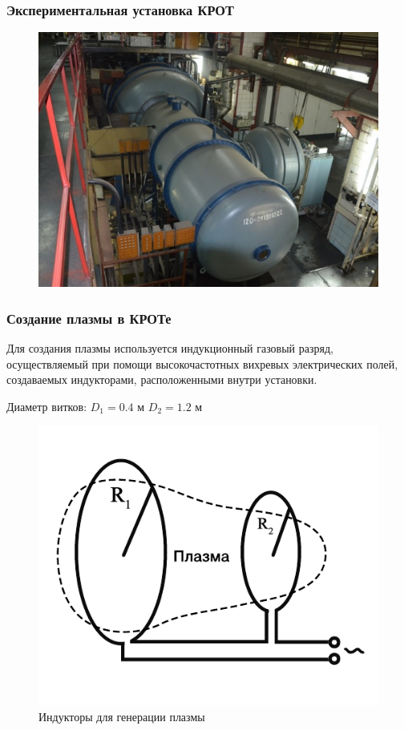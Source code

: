 \documentclass[10pt,pdf,hyperref={unicode}, dvipsnames]{beamer}
\begin{document}
\begin{frame}[t]\frametitle{Экспериментальная установка КРОТ}

\begin{figure}[H]
	\centering
	\vspace{-5pt}
	\includegraphics[width=\linewidth]{fig/krotphoto}
	\caption{}
	\label{fig:krot_photo}
\end{figure}



\end{frame}
\begin{frame}
	\frametitle{Создание плазмы в КРОТе}

		Для создания плазмы используется индукционный газовый разряд, осуществляемый при помощи высокочастотных вихревых электрических
	полей, создаваемых индукторами, расположенными внутри установки.

	Диаметр витков: $D_1=0.4$ м $D_2=1.2$ м

	\begin{figure}[H]
		\begin{minipage}{\linewidth}
				\centering
				\includegraphics[width=0.6\linewidth]{fig/induct}
				\vspace{-25pt}
				\caption*{Индукторы для генерации плазмы}

				\label{fig:resonator}
		\end{minipage}
		\end{figure}
\end{frame}
\end{document}
